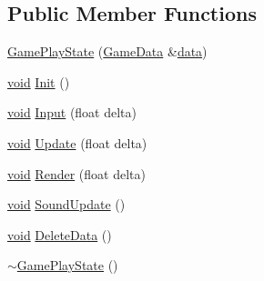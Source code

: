 \subsection*{Public Member Functions}
\begin{DoxyCompactItemize}
\item 
\hyperlink{classGamePlayState_ab20bfae56acce9a61770ec97a27ecd73}{Game\+Play\+State} (\hyperlink{structGameData}{Game\+Data} \&\hyperlink{imgui__impl__opengl3__loader_8h_abd87654504355b4c1bb002dcb1d4d16a}{data})
\item 
\hyperlink{imgui__impl__opengl3__loader_8h_ac668e7cffd9e2e9cfee428b9b2f34fa7}{void} \hyperlink{classGamePlayState_ae13389eea1f83f27d18ba200f107937d}{Init} ()
\item 
\hyperlink{imgui__impl__opengl3__loader_8h_ac668e7cffd9e2e9cfee428b9b2f34fa7}{void} \hyperlink{classGamePlayState_a3bc9231fd11546b5dd13581ed2aa1afa}{Input} (float delta)
\item 
\hyperlink{imgui__impl__opengl3__loader_8h_ac668e7cffd9e2e9cfee428b9b2f34fa7}{void} \hyperlink{classGamePlayState_a19bcc1ff2a83a3aa001010ae35d67b85}{Update} (float delta)
\item 
\hyperlink{imgui__impl__opengl3__loader_8h_ac668e7cffd9e2e9cfee428b9b2f34fa7}{void} \hyperlink{classGamePlayState_a4bd296aa04088a3d8249f569e86f21a7}{Render} (float delta)
\item 
\hyperlink{imgui__impl__opengl3__loader_8h_ac668e7cffd9e2e9cfee428b9b2f34fa7}{void} \hyperlink{classGamePlayState_a3367714db85b4d59a52bc1d8b0828d3c}{Sound\+Update} ()
\item 
\hyperlink{imgui__impl__opengl3__loader_8h_ac668e7cffd9e2e9cfee428b9b2f34fa7}{void} \hyperlink{classGamePlayState_a8a393249f2deabe0fe8f236b4e58cb17}{Delete\+Data} ()
\item 
\hyperlink{classGamePlayState_aaa1afd5f6e091e5cb5bda2fa82247d58}{$\sim$\+Game\+Play\+State} ()
\end{DoxyCompactItemize}
